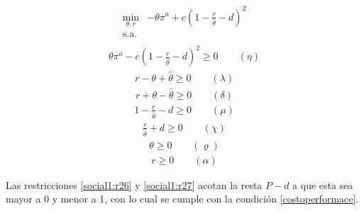\begin{equation}
\begin{array}{rrclcl}
\displaystyle \min_{\theta,r} & -\theta \pi^a + c(1-\frac{r}{\hat{\theta}}-d)^2 \\\textrm{s.a.} \label{fo:social2}\\
\end{array}
\end{equation}
\begin{equation}
\begin{array}{rrclcl}
\displaystyle \theta \pi^a - c(1-\frac{r}{\hat{\theta}}-d)^2 \geq 0 \qquad (\eta)\label{social1:r12}
\end{array}
\end{equation}
\begin{equation}
\begin{array}{rrclcl}
\displaystyle r - \theta + \hat{\theta} \geq 0 \qquad (\lambda)\label{social1:r22}
\end{array}
\end{equation}
\begin{equation}
\begin{array}{rrclcl}
\displaystyle r + \theta - \hat{\theta} \geq 0 \qquad (\delta)\label{social1:r23}
\end{array}
\end{equation}
\begin{equation}
\begin{array}{rrclcl}
1-\frac{r}{\hat{\theta}}-d \geq 0 \qquad (\mu)\label{social1:r26}
\end{array}
\end{equation}
\begin{equation}
\begin{array}{rrclcl}
\frac{r}{\hat{\theta}} + d \geq 0 \qquad (\chi)\label{social1:r27}
\end{array}
\end{equation}
\begin{equation}
\begin{array}{rrclcl}
\theta \geq 0 \qquad (\varrho)\label{social1:r24}
\end{array}
\end{equation}
\begin{equation}
\begin{array}{rrclcl}
r \geq 0 \qquad (\alpha)\label{social1:r25}
\end{array}
\end{equation}
\vspace{2.5mm}

Las restricciones \ref{social1:r26} y \ref{social1:r27} acotan la resta $P-d$ a que esta sea mayor a 0 y menor a 1, con lo cual se cumple con la condición \ref{costoperformace}. 
\vspace{2.5mm}

